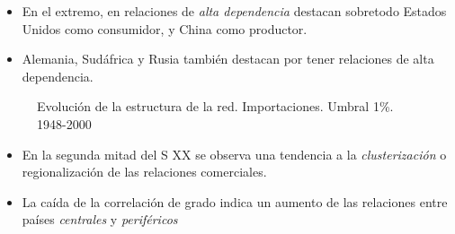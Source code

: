 \documentclass[compress]{beamer}
\begin{document}
\begin{frame}

\begin{itemize}
	\item[\faRebel] En el extremo, en relaciones de \textit{alta dependencia} destacan sobretodo Estados Unidos como consumidor, y China como productor.
	\item[\faRebel] Alemania, Sudáfrica y Rusia también destacan por tener relaciones de alta dependencia. 
\end{itemize}
\end{frame}



\begin{frame}
\begin{figure}
	
	\centering
	\caption*{\scriptsize Evolución de la estructura de la red. Importaciones. Umbral 1\%. 1948-2000}
	\label{fig:metricas_LP}
\end{figure}

\small
\begin{itemize}[label=\faRebel]
	\item En la segunda mitad del S XX se observa una tendencia a la \textit{clusterización } o regionalización de las relaciones comerciales.
	\item La caída de la correlación de grado indica un aumento de las relaciones entre países \textit{centrales} y \textit{periféricos}
\end{itemize}


\end{frame}
\end{document}
